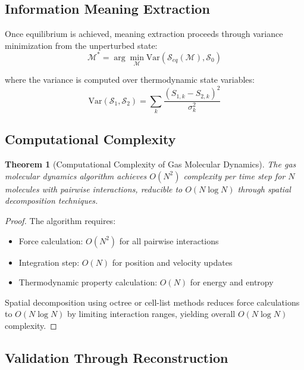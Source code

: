 \documentclass[11pt,a4paper]{article}
\newtheorem{theorem}{Theorem}[section]
\begin{document}
\subsection{Information Meaning Extraction}

Once equilibrium is achieved, meaning extraction proceeds through variance minimization from the unperturbed state:
\begin{equation}
\mathcal{M}^* = \arg\min_{\mathcal{M}} \text{Var}(\mathcal{S}_{eq}(\mathcal{M}), \mathcal{S}_0)
\label{eq:meaning-extraction}
\end{equation}

where the variance is computed over thermodynamic state variables:
\begin{equation}
\text{Var}(\mathcal{S}_1, \mathcal{S}_2) = \sum_{k} \frac{(S_{1,k} - S_{2,k})^2}{\sigma_k^2}
\label{eq:thermodynamic-variance}
\end{equation}

\subsection{Computational Complexity}

\begin{theorem}[Computational Complexity of Gas Molecular Dynamics]
The gas molecular dynamics algorithm achieves $O(N^2)$ complexity per time step for $N$ molecules with pairwise interactions, reducible to $O(N \log N)$ through spatial decomposition techniques.
\end{theorem}

\begin{proof}
The algorithm requires:
\begin{itemize}
\item Force calculation: $O(N^2)$ for all pairwise interactions
\item Integration step: $O(N)$ for position and velocity updates  
\item Thermodynamic property calculation: $O(N)$ for energy and entropy
\end{itemize}

Spatial decomposition using octree or cell-list methods reduces force calculations to $O(N \log N)$ by limiting interaction ranges, yielding overall $O(N \log N)$ complexity.
\end{proof}

\subsection{Validation Through Reconstruction}
\end{document}
